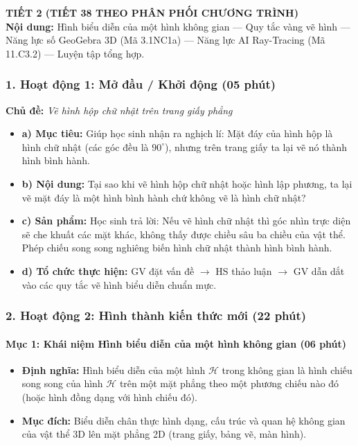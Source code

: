 \documentclass[12pt, a4paper]{article}
\begin{document}
{\large \textbf{TIẾT 2 (TIẾT 38 THEO PHÂN PHỐI CHƯƠNG TRÌNH)}}\\[0.3em]
\textbf{Nội dung:} Hình biểu diễn của một hình không gian --- Quy tắc vàng vẽ hình --- Năng lực số GeoGebra 3D (Mã 3.1NC1a) --- Năng lực AI Ray-Tracing (Mã 11.C3.2) --- Luyện tập tổng hợp.

\subsubsection*{1. Hoạt động 1: Mở đầu / Khởi động (05 phút)}
\textbf{Chủ đề:} \textit{Vẽ hình hộp chữ nhật trên trang giấy phẳng}
\begin{itemize}
    \item \textbf{a) Mục tiêu:} Giúp học sinh nhận ra nghịch lí: Mặt đáy của hình hộp là hình chữ nhật (các góc đều là $90^\circ$), nhưng trên trang giấy ta lại vẽ nó thành hình bình hành.
    \item \textbf{b) Nội dung:} Tại sao khi vẽ hình hộp chữ nhật hoặc hình lập phương, ta lại vẽ mặt đáy là một hình bình hành chứ không vẽ là hình chữ nhật?
    \item \textbf{c) Sản phẩm:} Học sinh trả lời: Nếu vẽ hình chữ nhật thì góc nhìn trực diện sẽ che khuất các mặt khác, không thấy được chiều sâu ba chiều của vật thể. Phép chiếu song song nghiêng biến hình chữ nhật thành hình bình hành.
    \item \textbf{d) Tổ chức thực hiện:} GV đặt vấn đề $\to$ HS thảo luận $\to$ GV dẫn dắt vào các quy tắc vẽ hình biểu diễn chuẩn mực.
\end{itemize}

\subsubsection*{2. Hoạt động 2: Hình thành kiến thức mới (22 phút)}

\paragraph{Mục 1: Khái niệm Hình biểu diễn của một hình không gian (06 phút)}
\begin{itemize}
    \item \textbf{Định nghĩa:} Hình biểu diễn của một hình $\mathscr{H}$ trong không gian là hình chiếu song song của hình $\mathscr{H}$ trên một mặt phẳng theo một phương chiếu nào đó (hoặc hình đồng dạng với hình chiếu đó).
    \item \textbf{Mục đích:} Biểu diễn chân thực hình dạng, cấu trúc và quan hệ không gian của vật thể 3D lên mặt phẳng 2D (trang giấy, bảng vẽ, màn hình).
\end{itemize}
\end{document}
